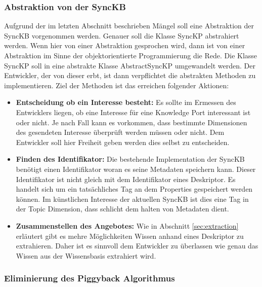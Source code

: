 \documentclass[a4paper]{article}
\begin{document}
	\subsubsection{Abstraktion von der SyncKB}
	\label{sec:sync_abstract}
	
	Aufgrund der im letzten Abschnitt beschrieben Mängel soll eine Abstraktion der
	SyncKB vorgenommen werden. Genauer soll die Klasse SyncKP abstrahiert werden.
	Wenn hier von einer Abstraktion gesprochen wird, dann ist von einer Abstraktion 
	im Sinne der objektorientierte Programmierung die Rede. Die Klasse SyncKP soll in
	eine abstrakte Klasse AbstractSyncKP umgewandelt werden. Der Entwickler, der
	von dieser erbt, ist dann verpflichtet die abstrakten Methoden 
	zu implementieren. Ziel der Methoden ist das erreichen folgender Aktionen:
	
	\begin{itemize}
		\item \textbf{Entscheidung ob ein Interesse besteht:} Es sollte im 
		Ermessen des Entwicklers liegen, ob eine Interesse
		für eine Knowledge Port interessant ist oder nicht. Je nach Fall kann
		es vorkommen, dass bestimmte Dimensionen des gesendeten Interesse überprüft
		werden müssen oder nicht. Dem Entwickler soll hier Freiheit geben werden
		dies selbst zu entscheiden.
		\item \textbf{Finden des Identifikator:} Die bestehende Implementation der
		SyncKB benötigt einen Identifikator woran es seine Metadaten speichern
		kann. Dieser Identifikator ist nicht gleich mit dem Identifikator eines
		Deskriptor. Es handelt sich um ein tatsächliches Tag an dem Properties
		gespeichert werden können. Im künstlichen Interesse der aktuellen SyncKB
		ist dies eine Tag in der Topic Dimension, dass schlicht dem halten von
		Metadaten dient.
		\item \textbf{Zusammenstellen des Angebotes:} Wie in Abschnitt
		\ref{sec:extraction} erläutert gibt es mehre Möglichkeiten Wissen
		anhand eines Deskriptor zu extrahieren. Daher ist es sinnvoll dem
		Entwickler zu überlassen wie genau das Wissen aus der Wissensbasis
		extrahiert wird. 
	\end{itemize} 	
	
	\subsubsection{Eliminierung des Piggyback Algorithmus}
	\label{sec:piggyback}
	
\end{document}
